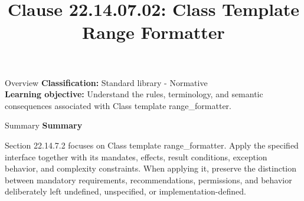 \documentclass[10pt,letterpaper]{article}
\title{Clause 22.14.07.02: Class Template Range Formatter}
\author{}
\date{}
\begin{document}
\maketitle
\begin{CornellOverviewBox}{Overview}
\textbf{Classification:} Standard library - Normative\\[2pt]
\textbf{Learning objective:} Understand the rules, terminology, and semantic consequences associated with Class template range\_formatter.
\end{CornellOverviewBox}\begin{CornellSummaryBox}{Summary}
{\sffamily\bfseries\color{Accent} Summary}\par\vspace{3pt}Section 22.14.7.2 focuses on Class template range\_formatter. Apply the specified interface together with its mandates, effects, result conditions, exception behavior, and complexity constraints. When applying it, preserve the distinction between mandatory requirements, recommendations, permissions, and behavior deliberately left undefined, unspecified, or implementation-defined.
\end{CornellSummaryBox}
\end{document}
